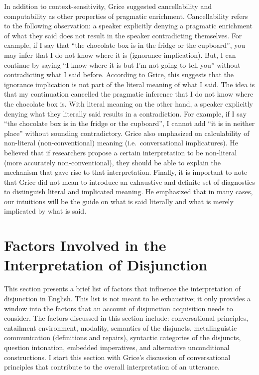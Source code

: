 \documentclass[oneside]{report}
\theoremstyle{definition}
\theoremstyle{definition}
\theoremstyle{definition}
\theoremstyle{remark}
\begin{document}
In addition to context-sensitivity, Grice suggested cancellability and
computability as other properties of pragmatic enrichment.
Cancellability refers to the following observation: a speaker explicitly
denying a pragmatic enrichment of what they said does not result in the
speaker contradicting themselves. For example, if I say that ``the
chocolate box is in the fridge or the cupboard'', you may infer that I
do not know where it is (ignorance implication). But, I can continue by
saying ``I know where it is but I'm not going to tell you'' without
contradicting what I said before. According to Grice, this suggests that
the ignorance implication is not part of the literal meaning of what I
said. The idea is that my continuation cancelled the pragmatic inference
that I do not know where the chocolate box is. With literal meaning on
the other hand, a speaker explicitly denying what they literally said
results in a contradiction. For example, if I say ``the chocolate box is
in the fridge or the cupboard'', I cannot add ``it is in neither place''
without sounding contradictory. Grice also emphasized on calculability
of non-literal (non-conventional) meaning (i.e.~conversational
implicatures). He believed that if researchers propose a certain
interpretation to be non-literal (more accurately non-conventional),
they should be able to explain the mechanism that gave rise to that
interpretation. Finally, it is important to note that Grice did not mean
to introduce an exhaustive and definite set of diagnostics to
distinguish literal and implicated meaning. He emphasized that in many
cases, our intuitions will be the guide on what is said literally and
what is merely implicated by what is said.

\section{Factors Involved in the Interpretation of
Disjunction}\label{factors-involved-in-the-interpretation-of-disjunction}

This section presents a brief list of factors that influence the
interpretation of disjunction in English. This list is not meant to be
exhaustive; it only provides a window into the factors that an account
of disjunction acquisition needs to consider. The factors discussed in
this section include: conversational principles, entailment environment,
modality, semantics of the disjuncts, metalinguistic communication
(definitions and repairs), syntactic categories of the disjuncts,
question intonation, embedded imperatives, and alternative unconditional
constructions. I start this section with Grice's discussion of
conversational principles that contribute to the overall interpretation
of an utterance.
\end{document}
